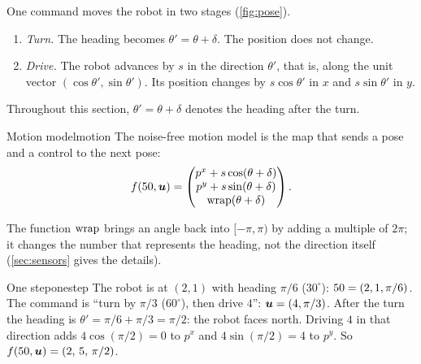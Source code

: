 One command moves the robot in two stages (\cref{fig:pose}).
\begin{enumerate}[nosep]
  \item \emph{Turn.} The heading becomes $\theta'=\theta+\delta$. The
    position does not change.
  \item \emph{Drive.} The robot advances by $s$ in the direction $\theta'$,
    that is, along the unit vector $(\cos\theta',\sin\theta')$. Its
    position changes by $s\cos\theta'$ in $x$ and $s\sin\theta'$ in $y$.
\end{enumerate}
Throughout this section, $\theta'=\theta+\delta$ denotes the heading after
the turn.

\begin{definition}{Motion model}{motion}
The noise-free motion model is the map that sends a pose and a control to
the next pose:
\begin{equation}\label{eq:f}
  f(50,\bm{u})=\begin{pmatrix}p^x+s\cos(\theta+\delta)\\
  p^y+s\sin(\theta+\delta)\\ \operatorname{wrap}(\theta+\delta)\end{pmatrix}.
\end{equation}
\end{definition}

The function $\operatorname{wrap}$ brings an angle back into $[-\pi,\pi)$ by adding a
multiple of $2\pi$; it changes the number that represents the heading, not
the direction itself (\cref{sec:sensors} gives the details).

\begin{example}{One step}{onestep}
The robot is at $(2,1)$ with heading $\pi/6$ ($30^\circ$): $50=(2,1,\pi/6)$.
The command is ``turn by $\pi/3$ ($60^\circ$), then drive $4$'':
$\bm{u}=(4,\pi/3)$. After the turn the heading is $\theta'=\pi/6+\pi/3=\pi/2$:
the robot faces north. Driving $4$ in that direction adds
$4\cos(\pi/2)=0$ to $p^x$ and $4\sin(\pi/2)=4$ to $p^y$. So
$f(50,\bm{u})=(2,\,5,\,\pi/2)$.
\end{example}

